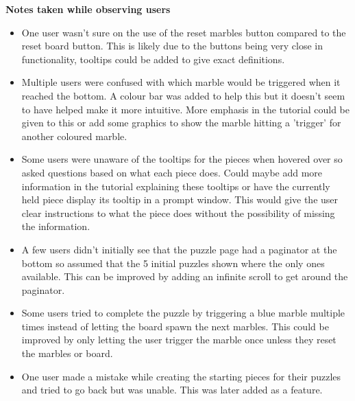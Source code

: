 \documentclass{l4proj}
\begin{document}
\textbf{Notes taken while observing users}
\begin{itemize}
    \item One user wasn't sure on the use of the reset marbles button compared to the reset board button. This is likely due to the buttons being very close in functionality, tooltips could be added to give exact definitions.
    \item Multiple users were confused with which marble would be triggered when it reached the bottom. A colour bar was added to help this but it doesn't seem to have helped make it more intuitive. More emphasis in the tutorial could be given to this or add some graphics to show the marble hitting a 'trigger' for another coloured marble.
    \item Some users were unaware of the tooltips for the pieces when hovered over so asked questions based on what each piece does. Could maybe add more information in the tutorial explaining these tooltips or have the currently held piece display its tooltip in a prompt window. This would give the user clear instructions to what the piece does without the possibility of missing the information.
    \item A few users didn't initially see that the puzzle page had a paginator at the bottom so assumed that the 5 initial puzzles shown where the only ones available. This can be improved by adding an infinite scroll to get around the paginator.
    \item Some users tried to complete the puzzle by triggering a blue marble multiple times instead of letting the board spawn the next marbles. This could be improved by only letting the user trigger the marble once unless they reset the marbles or board.
    \item One user made a mistake while creating the starting pieces for their puzzles and tried to go back but was unable. This was later added as a feature.
\end{itemize}
\end{document}

